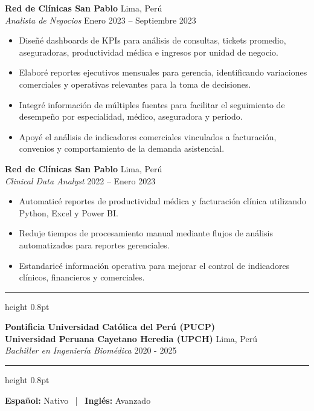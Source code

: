 \documentclass[11pt,a4paper]{article}
\newcommand{\mysection}[1]{%
    \vspace{0.3cm}
    \noindent{\large\bfseries\color{primary} #1}\par
    \vspace{0.1cm}
    {\color{primary}\hrule height 0.8pt}\par
    \vspace{0.2cm}
}
\newenvironment{myitemize}{
  \begin{itemize}
    \setlength{\itemsep}{2pt}
    \setlength{\parskip}{0pt}
    \setlength{\parsep}{0pt}
    \setlength{\topsep}{2pt}
}{
  \end{itemize}
}
\begin{document}
\vspace{0.4cm}

\noindent \textbf{Red de Clínicas San Pablo} \hfill Lima, Perú \\
\textit{Analista de Negocios} \hfill Enero 2023 -- Septiembre 2023
\begin{myitemize}
    \item Diseñé dashboards de KPIs para análisis de consultas, tickets promedio, aseguradoras, productividad médica e ingresos por unidad de negocio.
    \item Elaboré reportes ejecutivos mensuales para gerencia, identificando variaciones comerciales y operativas relevantes para la toma de decisiones.
    \item Integré información de múltiples fuentes para facilitar el seguimiento de desempeño por especialidad, médico, aseguradora y periodo.
    \item Apoyé el análisis de indicadores comerciales vinculados a facturación, convenios y comportamiento de la demanda asistencial.
\end{myitemize}

\vspace{0.2cm}

\noindent \textbf{Red de Clínicas San Pablo} \hfill Lima, Perú \\
\textit{Clinical Data Analyst} \hfill 2022 -- Enero 2023
\begin{myitemize}
    \item Automaticé reportes de productividad médica y facturación clínica utilizando Python, Excel y Power BI.
    \item Reduje tiempos de procesamiento manual mediante flujos de análisis automatizados para reportes gerenciales.
    \item Estandaricé información operativa para mejorar el control de indicadores clínicos, financieros y comerciales.
\end{myitemize}

\mysection{Educación}

\noindent \textbf{Pontificia Universidad Católica del Perú (PUCP)} \\
\textbf{Universidad Peruana Cayetano Heredia (UPCH)} \hfill Lima, Perú \\
\textit{Bachiller en Ingeniería Biomédica} \hfill 2020 - 2025

\mysection{Idiomas}
\noindent \textbf{Español:} Nativo \ | \ \textbf{Inglés:} Avanzado
\end{document}
